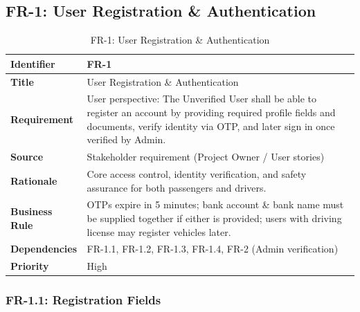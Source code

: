 \subsection{FR-1: User Registration \& Authentication}

\begin{longtable}{|p{3cm}|p{12cm}|}
\caption{FR-1: User Registration \& Authentication}
\label{tab:fr-1} \\
\hline
\rowcolor{lightgray!30}
\textbf{Identifier} & FR-1 \\
\hline
\textbf{Title} & User Registration \& Authentication \\
\hline
\textbf{Requirement} & User perspective: The Unverified User shall be able to register an account by providing required profile fields and documents, verify identity via OTP, and later sign in once verified by Admin. \\
\hline
\textbf{Source} & Stakeholder requirement (Project Owner / User stories) \\
\hline
\textbf{Rationale} & Core access control, identity verification, and safety assurance for both passengers and drivers. \\
\hline
\textbf{Business Rule} & OTPs expire in 5 minutes; bank account \& bank name must be supplied together if either is provided; users with driving license may register vehicles later. \\
\hline
\textbf{Dependencies} & FR-1.1, FR-1.2, FR-1.3, FR-1.4, FR-2 (Admin verification) \\
\hline
\textbf{Priority} & High \\
\hline
\end{longtable}

\subsubsection{FR-1.1: Registration Fields}

